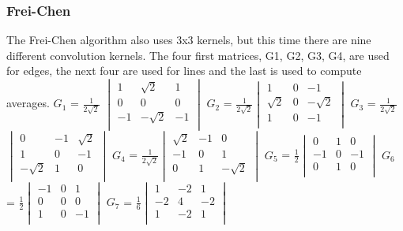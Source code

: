\documentclass[12pt]{article}
\begin{document}
\subsubsection{Frei-Chen}
 The Frei-Chen algorithm also uses 3x3 kernels, but this time there are nine different convolution kernels. The four first matrices, G1, G2, G3, G4, are used for edges, the next four are used for lines and the last is used to compute averages. 
\newline
\newline
 $G_1$ = $\frac{1}{2\sqrt2}$ $\begin{vmatrix}
	1 & \sqrt2 & 1\\
	0 & 0 & 0\\
	-1 & -\sqrt2 & -1\\
\end{vmatrix}$\hspace{5mm}
$G_2$ = $\frac{1}{2\sqrt2}$$\begin{vmatrix}
	1 & 0 & -1\\
	\sqrt2 & 0 & -\sqrt2\\
	1 & 0 & -1\\
\end{vmatrix}$\hspace{5mm}
$G_3$ = $\frac{1}{2\sqrt2}$$\begin{vmatrix}
	0 & -1 & \sqrt2\\
	1 & 0 & -1\\
	-\sqrt2 & 1 & 0\\
\end{vmatrix}$\hspace{5mm}
\newline
$G_4$ = $\frac{1}{2\sqrt2}$$\begin{vmatrix}
	\sqrt2 & -1 & 0\\
	-1 & 0 & 1\\
	0 & 1 & -\sqrt2\\
\end{vmatrix}$\hspace{5mm}
$G_5$ = $\frac{1}{2}$$\begin{vmatrix}
	0 & 1 & 0\\
	-1 & 0 & -1\\
	0 & 1 & 0\\
\end{vmatrix}$\hspace{10mm}
$G_6$ = $\frac{1}{2}$$\begin{vmatrix}
	-1 & 0 & 1\\
	0 & 0 & 0\\
	1 & 0 & -1\\
\end{vmatrix}$\hspace{5mm}
\newline
$G_7$ = $\frac{1}{6}$$\begin{vmatrix}
	1 & -2 & 1\\
	-2 & 4 & -2\\
	1 & -2 & 1\\
\end{vmatrix}$\hspace{13mm}
\end{document}
